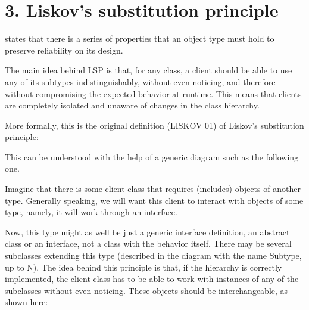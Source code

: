 \documentclass[a4paper,10pt,english]{sphinxmanual}
\begin{document}
\section{3. Liskov’s substitution principle}
\label{\detokenize{chapters/4_solid_principles/index:liskov-s-substitution-principle}}
 states that there is a series of properties that an object
type must hold to preserve reliability on its design.

The main idea behind LSP is that, for any class, a client should be able to use any of its
subtypes indistinguishably, without even noticing, and therefore without compromising
the expected behavior at runtime. This means that clients are completely isolated and
unaware of changes in the class hierarchy.

More formally, this is the original definition (LISKOV 01) of Liskov’s substitution principle:

\begin{sphinxVerbatim}[commandchars=\\\{\}]
                       
\end{sphinxVerbatim}

This can be understood with the help of a generic diagram such as the following one.

Imagine that there is some client class that requires (includes) objects of another type.
Generally speaking, we will want this client to interact with objects of some type, namely, it
will work through an interface.

Now, this type might as well be just a generic interface definition, an abstract class or an
interface, not a class with the behavior itself. There may be several subclasses extending this
type (described in the diagram with the name Subtype, up to N). The idea behind this
principle is that, if the hierarchy is correctly implemented, the client class has to be able to
work with instances of any of the subclasses without even noticing. These objects should be
interchangeable, as shown here:

\begin{figure}[H]
\centering

\noindent{}
\end{figure}
\end{document}
